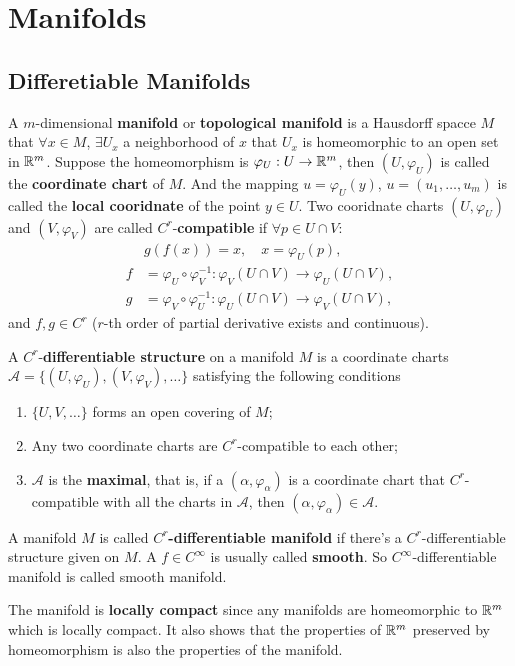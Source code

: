 \section{Manifolds}



\subsection{Differetiable Manifolds}
\begin{definition}
A $m$-dimensional \textbf{manifold} or \textbf{topological manifold} is a Hausdorff spacce $M$ that $\forall x\in M$, $\exists U_x$ a neighborhood of $x$ that $U_x$ is homeomorphic to an open set in $\mathbb{R}^m$. Suppose the homeomorphism is $\varphi_U:U\to\mathbb{R}^m$, then $(U,\varphi_U)$ is called the \textbf{coordinate chart} of $M$. And the mapping $u=\varphi_U(y)$, $u=(u_1,\dots,u_m)$ is called the \textbf{local cooridnate} of the point $y\in U$. Two cooridnate charts $(U,\varphi_U)$ and $(V,\varphi_V)$ are called $C^r$-\textbf{compatible} if $\forall p\in U\cap V$:
\begin{equation}
\begin{aligned}
&g(f(x))=x,\quad x=\varphi_U(p),\\
f&=\varphi_U\circ\varphi_V^{-1}:\varphi_V(U\cap V)\to \varphi_U(U\cap V),\\
g&=\varphi_V\circ\varphi_U^{-1}:\varphi_U(U\cap V)\to \varphi_V(U\cap V),
\end{aligned}
\end{equation}
and $f,g\in C^r$ ($r$-th order of partial derivative exists and continuous). 
\end{definition} 

\begin{definition}
A $C^r$-\textbf{differentiable structure} on a manifold $M$ is a coordinate charts $\mathcal{A}=\{(U,\varphi_U),(V,\varphi_V),\dots\}$ satisfying the following conditions
\begin{enumerate}
\item $\{U,V,\dots\}$ forms an open covering of $M$;
\item Any two coordinate charts are $C^r$-compatible to each other;
\item $\mathcal{A}$ is the \textbf{maximal}, that is, if a $(\alpha,\varphi_\alpha)$ is a coordinate chart that $C^r$-compatible with all the charts in $\mathcal{A}$, then $(\alpha,\varphi_\alpha)\in\mathcal{A}$.
\end{enumerate}
A manifold $M$ is called $C^r$\textbf{-differentiable manifold} if there's a $C^r$-differentiable structure given on $M$. A $f\in C^\infty$ is usually called \textbf{smooth}. So $C^\infty$-differentiable manifold is called smooth manifold.
\end{definition}

The manifold is \textbf{locally compact} since any manifolds are homeomorphic to $\mathbb{R}^m$ which is locally compact. It also shows that the properties of $\mathbb{R}^m$ preserved by homeomorphism is also the properties of the manifold. 